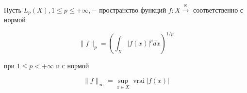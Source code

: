 \documentclass[10pt]{article}
\begin{document}
Пусть $L_{p}(X), 1 \leqslant p \leqslant+\infty,-$ пространство функций $f: X \stackrel{\mathbb{R}}{\rightarrow}$ соответственно с нормой



\[

\|f\|_{p}=\left(\int_{X}|f(x)|^{p} d x\right)^{1 / p}

\]



при $1 \leqslant p<+\infty$ и с нормой



\[

\|f\|_{\infty}=\sup _{x \in X} \operatorname{vrai}|f(x)|

\]
\end{document}
